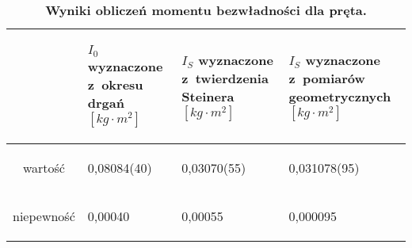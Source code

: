 \documentclass[a4paper,11pt]{article}
\begin{document}
\begin{table}[ht]
\centering
\caption{\textbf{Wyniki obliczeń momentu bezwładności dla pręta.}}
\begin{tabular}{|c|m{30mm}|m{30mm}|m{30mm}|}
\hline
& \begin{center}
\textbf{$I_{0}$ wyznaczone z~okresu drgań $[kg\cdot m^{2}]$}
\end{center} & \begin{center}
\textbf{$I_{S}$ wyznaczone z~twierdzenia Steinera $[kg\cdot m^{2}]$}
\end{center} & \begin{center}
\textbf{$I_{S}$ wyznaczone z~pomiarów geometrycznych $[kg\cdot m^{2}]$}
\end{center}  \\ \hline
wartość & \begin{center}0,08084(40)\end{center} & \begin{center}0,03070(55)\end{center} & \begin{center}0,031078(95)\end{center}\\ \hline
niepewność &\begin{center}0,00040\end{center} & \begin{center}0,00055\end{center} & \begin{center}0,000095\end{center}\\ \hline

\end{tabular}
\end{table}
\end{document}
